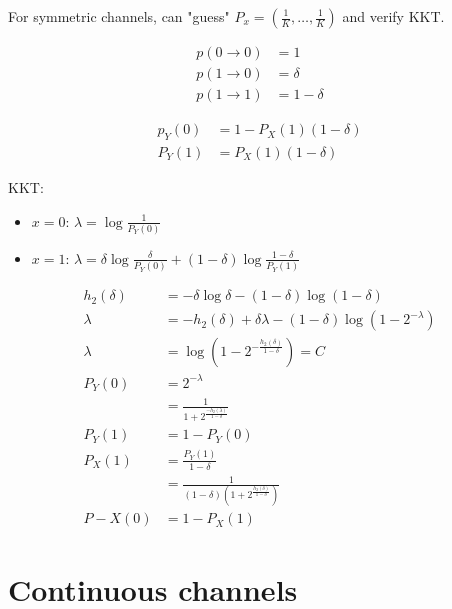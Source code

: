 \begin{remark}
    For symmetric channels, can "guess" $P_x = \left( \frac{1}{K},\ldots,\frac{1}{K}\right)$ and verify KKT.
\end{remark}

\begin{definition}[Z-channel]
    \[
        \begin{aligned}
            p(0 \to 0) &= 1\\
            p(1 \to 0) &= \delta\\
            p(1 \to 1) &= 1 - \delta
        \end{aligned}
    \]
\end{definition}

\[
    \begin{aligned}
        p_Y(0) &= 1-P_X(1)(1-\delta)\\
        P_Y(1) &= P_X(1)(1-\delta)
    \end{aligned}            
\]

KKT:
\begin{itemize}
    \item $x=0$: $\lambda = \log \frac{1}{P_Y(0)}$
    \item $x=1$: $\lambda = \delta \log \frac{\delta}{P_Y(0)} + (1-\delta) \log \frac{1-\delta}{P_Y(1)}$
\end{itemize}


\[
    \begin{aligned}
        h_2(\delta) &= -\delta \log \delta - (1-\delta) \log(1-\delta)\\
        \lambda &= -h_2(\delta) + \delta \lambda - (1-\delta) \log\left (1-2^{-\lambda}\right )\\
        \lambda &= \log\left( 1-2^{-\frac{h_2(\delta)}{1-\delta}} \right) = C\\
        P_Y(0) &= 2^{-\lambda}\\
        &= \frac{1}{1+2^{\frac{-h_2(\lambda)}{1-\delta}}}\\
        P_Y(1) &= 1- P_Y(0)\\
        P_X(1) &= \frac{P_Y(1)}{1-\delta}\\
        &= \frac{1}{(1-\delta)\left(1+2^{\frac{h_2(\delta)}{1-\delta}}\right)}\\
        P-X(0) &= 1-P_X(1)
    \end{aligned}
\]

\section{Continuous channels}

